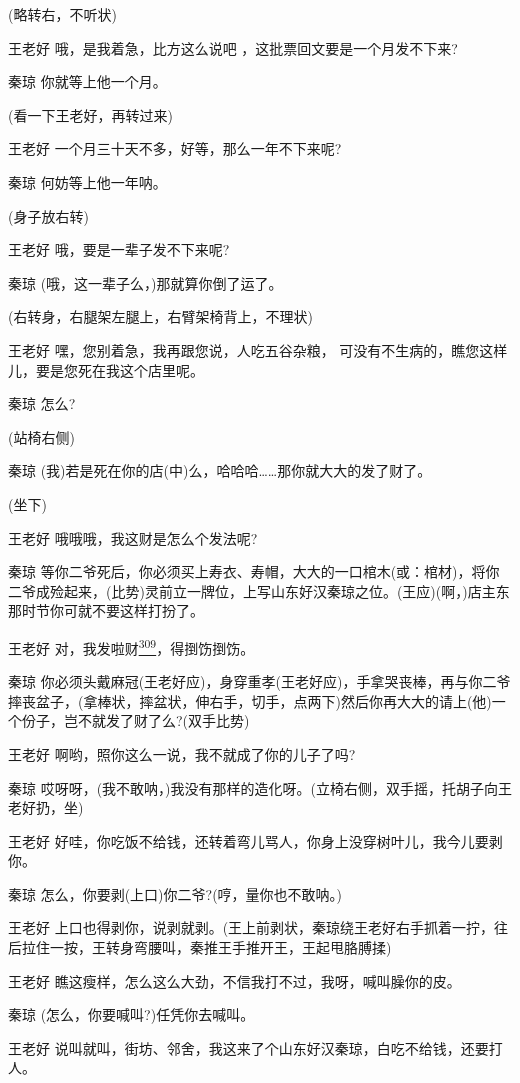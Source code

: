 (略转右，不听状)

王老好 哦，是我着急，比方这么说吧 ，这批票回文要是一个月发不下来?

秦琼 你就等上他一个月。

(看一下王老好，再转过来)

王老好 一个月三十天不多，好等，那么一年不下来呢?

秦琼 何妨等上他一年呐。

(身子放右转)

王老好 哦，要是一辈子发不下来呢?

秦琼 (哦，这一辈子么，)那就算你倒了运了。

(右转身，右腿架左腿上，右臂架椅背上，不理状)

王老好 嘿，您别着急，我再跟您说，人吃五谷杂粮，
可没有不生病的，瞧您这样儿，要是您死在我这个店里呢。

秦琼 怎么?

(站椅右侧)

秦琼
(我)若是死在你的店(中)么，哈哈哈\ldots{}\ldots{}那你就大大的发了财了。

(坐下)

王老好 哦哦哦，我这财是怎么个发法呢?

秦琼
等你二爷死后，你必须买上寿衣、寿帽，大大的一口棺木(或：棺材)，将你二爷成殓起来，(比势)灵前立一牌位，上写山东好汉秦琼之位。(王应)(啊，)店主东那时节你可就不要这样打扮了。

王老好
对，我发啦财\protect\hyperlink{fn309}{\textsuperscript{309}}，得捯饬捯饬。

秦琼
你必须头戴麻冠(王老好应)，身穿重孝(王老好应)，手拿哭丧棒，再与你二爷摔丧盆子，(拿棒状，摔盆状，伸右手，切手，点两下)然后你再大大的请上(他)一个份子，岂不就发了财了么?(双手比势)

王老好 啊哟，照你这么一说，我不就成了你的儿子了吗?

秦琼
哎呀呀，(我不敢呐，)我没有那样的造化呀。(立椅右侧，双手摇，托胡子向王老好扔，坐)

王老好
好哇，你吃饭不给钱，还转着弯儿骂人，你身上没穿树叶儿，我今儿要剥你。

秦琼 怎么，你要剥(上口)你二爷?(哼，量你也不敢呐。)

王老好
上口也得剥你，说剥就剥。(王上前剥状，秦琼绕王老好右手抓着一拧，往后拉住一按，王转身弯腰叫，秦推王手推开王，王起甩胳膊揉)

王老好 瞧这瘦样，怎么这么大劲，不信我打不过，我呀，喊叫臊你的皮。

秦琼 (怎么，你要喊叫?)任凭你去喊叫。

王老好
说叫就叫，街坊、邻舍，我这来了个山东好汉秦琼，白吃不给钱，还要打人。

